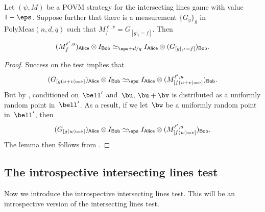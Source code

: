 \documentclass[11pt]{article}
\newcommand{\consistency}{\simeq}
\newcommand{\reg}[1]{{\mathsf{#1}}}
\begin{document}
\begin{lemma}\label{lem:intersecting-lines}
Let $(\psi, M)$ be a POVM strategy for the intersecting lines game
with value $1-\eps$.
Suppose further that there is a measurement $\{G_g\}_g$ in $\mathrm{PolyMeas}(n,d,q)$ such that
$M^{\ell, v}_{f} = G_{[g|_{\ell}=f]}$. Then
\begin{equation*}
(M^{\ell', u}_{f})_{\reg{Alice}} \otimes I_{\reg{Bob}} \consistency_{\eps + d/q} I_{\reg{Alice}} \otimes (G_{[g|_{\ell'}=f]})_{\reg{Bob}}.
\end{equation*}
\end{lemma}
\begin{proof}
Success on the test implies that
\begin{equation*}
(G_{[g(u + v) = \nu]})_{\reg{Alice}} \otimes I_{\reg{Bob}}
\consistency_{\eps} I_{\reg{Alice}} \otimes (M^{\ell', u}_{[f(u + v) = \nu]})_{\reg{Bob}}.
\end{equation*}
But by , conditioned on~$\bell'$ and~$\bu$, $\bu + \bv$
is distributed as a uniformly random point in~$\bell'$.
As a result, if we let~$\bw$ be a uniformly random point in~$\bell'$, then
\begin{equation*}
(G_{[g(w) = \nu]})_{\reg{Alice}} \otimes I_{\reg{Bob}}
\consistency_{\eps} I_{\reg{Alice}} \otimes (M^{\ell', u}_{[f(w) = \nu]})_{\reg{Bob}}.
\end{equation*}
The lemma then follows from .
\end{proof}

\subsection{The introspective intersecting lines test}\label{sec:introspective-lines-transfer}

Now we introduce the introspective intersecting lines test.
This will be an introspective version of the intersecting lines test.
\end{document}
